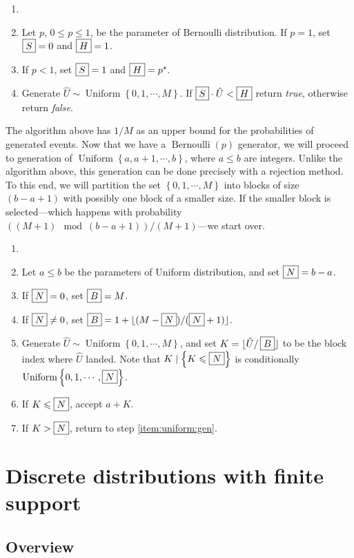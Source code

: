 \documentclass{article}
\renewcommand{\leq}{\leqslant}
\theoremstyle{definition} %
\newenvironment{algorithm}[1]
  {\renewcommand\theAUXalgorithm{#1}\AUXalgorithm\begin{enumerate}\item[]}
  {\end{enumerate}\endAUXalgorithm}
\DeclareMathOperator{\DBernoulli}{\mathrm{Bernoulli}} %
\DeclareMathOperator{\DUnif}{\mathrm{Uniform}} %
\newcommand{\cache}[1]{\fbox{$#1$}}
\newcommand{\floor}[1]{\lfloor{#1}\rfloor}
\newcommand{\set}[1]{\left\{ {#1} \right\}} %
\begin{document}
\begin{algorithm}{(Bernoulli)}
    \item Let $p$, $0 \leq p \leq 1$, be the parameter of Bernoulli distribution. If $p = 1$, set $\cache{S} = 0$ and $\cache{H} = 1$.
    \item If $p < 1$, set $\cache{S} = 1$ and $\cache{H} = p^\star $.
    \item Generate $\hat{U} \sim \DUnif \set{0, 1, \cdots , M}$. If $\cache{S} \cdot \hat{U} < \cache{H}$ return \emph{true}, otherwise return \emph{false}.
\end{algorithm}
%
The algorithm above has $1 / M$ as an upper bound for the probabilities of generated events.
%
Now that we have a $\DBernoulli (p)$ generator, we will proceed to generation of $\DUnif \set{a, a + 1, \cdots , b}$, where $a \leq b$ are integers. Unlike the algorithm above, this generation can be done precisely with a rejection method. To this end, we will partition the set $\set{0, 1, \cdots , M}$ into blocks of size $(b - a + 1)$ with possibly one block of a smaller size. If the smaller block is selected---which happens with probability $((M + 1) \mod (b - a + 1)) / (M + 1)$---we start over.

\begin{algorithm}{(Discrete Uniform)}
    \item Let $a \leq b$ be the parameters of Uniform distribution, and set $\cache{N} = b - a$.
    \item If $\cache{N} = 0$, set $\cache{B} = M$.
    \item If $\cache{N} \neq 0$, set $\cache{B} = 1 + \floor{(M - \cache{N}) / (\cache{N} + 1)}$.
    \item \label{item:uniform:gen} Generate $\hat{U} \sim \DUnif \set{0, 1, \cdots , M}$, and set $K = \floor{\hat{U} / \,\cache{B}}$ to be the block index where $\hat{U}$ landed. Note that $K \mid \set{K \leq \cache{N}}$ is conditionally $\DUnif \set{0, 1, \cdots , \cache{N}}$.
    \item If $K \leq \cache{N}$, accept $a + K$.
    \item If $K > \cache{N}$, return to step \ref{item:uniform:gen}.
\end{algorithm}

\section{Discrete distributions with finite support}

\subsection{Overview}
\end{document}
